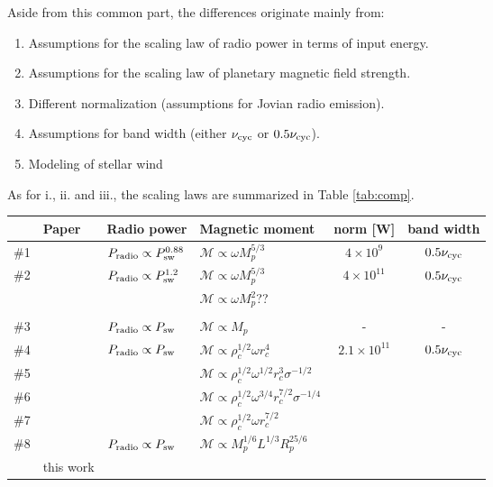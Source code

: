 \documentclass[iop,numberedappendix,apj]{emulateapj}
\begin{document}
Aside from this common part, the differences originate mainly from:
\renewcommand{\theenumi}{\roman{enumi}}
\begin{enumerate}
\item Assumptions for the scaling law of radio power in terms of input energy. 
\item Assumptions for the scaling law of planetary magnetic field strength. 
\item Different normalization (assumptions for Jovian radio emission). 
\item Assumptions for band width (either $\nu_{\rm cyc}$ or $0.5\nu_{\rm cyc}$). 
\item Modeling of stellar wind
\end{enumerate}

As for i., ii. and iii., the scaling laws are summarized in Table \ref{tab:comp}. 

\begin{table*}[htp]
\caption{Comparison for assumed scaling relationships.}
\begin{center}
\begin{tabular}{c|l|llcc} \hline \hline
%
& Paper & Radio power & Magnetic moment  & norm [W] & band width \\\hline
%
\#1 & \citet{farrell1999} & $P_{\rm radio} \propto P_{\rm sw}^{0.88} $ & $\mathcal{M} \propto \omega M_p^{5/3}$ & $4 \times 10^9$ & $ 0.5 \nu_{\rm cyc}$ \\ \hline
%
\#2 & \citet{farrell1999} & $P_{\rm radio} \propto P_{\rm sw}^{1.2} $ & $\mathcal{M} \propto \omega M_p^{5/3}$ & $4 \times 10^{11}$ & $ 0.5 \nu_{\rm cyc}$ \\
& \citet{lazio2004} & & $\mathcal{M} \propto \omega M_p^{2}$?? & & \\
& \citet{ignace2010} & & & & \\ \hline
\#3 & \citet{stevens2005} & $P_{\rm radio} \propto P_{\rm sw} $ & $\mathcal{M} \propto M_p$ & - & - \\ \hline
\#4 & \citet{griesmeier2005,griesmeier2007a,griesmeier2007b} & $P_{\rm radio} \propto P_{\rm sw}$ & $\mathcal{M} \propto \rho _c^{1/2} \omega r_c^4 $ & $2.1 \times 10^{11}$ & $ 0.5 \nu_{\rm cyc}$ \\
\#5 & & & $\mathcal{M} \propto \rho _c^{1/2} \omega^{1/2} r_c^3 \sigma ^{-1/2} $ & & \\
\#6 & & & $\mathcal{M} \propto \rho _c^{1/2} \omega^{3/4} r_c^{7/2} \sigma ^{-1/4} $ & \\
\#7 & & & $\mathcal{M} \propto \rho _c^{1/2} \omega r_c^{7/2}$ & & \\ \hline
\#8 & \citet{reiners2010} & $P_{\rm radio} \propto P_{\rm sw}$ & $\mathcal{M} \propto M_p^{1/6} L^{1/3} R_p^{25/6}$ \\ 
 & this work & & \\ \hline
\end{tabular}
\end{center}
\label{tab:comp}
\tablecomments{}
\end{table*}
\end{document}
